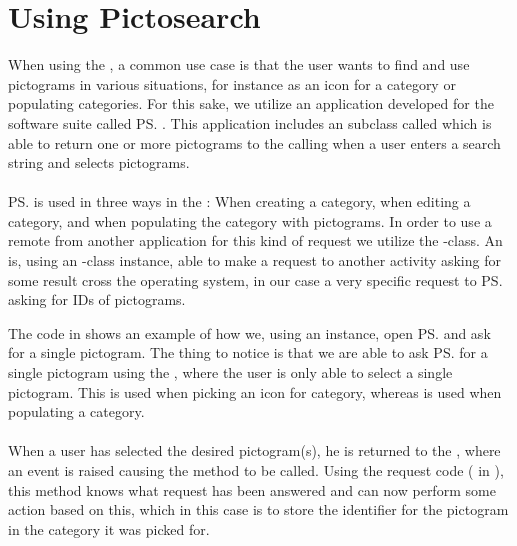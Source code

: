 
\section{Using Pictosearch}
\label{sec:using_pictosearch}

When using the \ct, a common use case is that the user wants to find and use pictograms in various situations, for instance as an icon for a category or populating categories. For this sake, we utilize an application developed for the \giraf software suite called \ps. This application includes an  subclass called  which is able to return one or more pictograms to the calling  when a user enters a search string and selects pictograms. 
\\\\
\ps is used in three ways in the \ct: When creating a category, when editing a category, and when populating the category with pictograms. In order to use a remote  from another application for this kind of request we utilize the -class. An  is, using an -class instance, able to make a request to another activity asking for some result cross the operating system, in our case a very specific request to \ps asking for IDs of pictograms. 



The code in  shows an example of how we, using an  instance, open \ps and ask for a single pictogram. The thing to notice is that we are able to ask \ps for a single pictogram using the , where the user is only able to select a single pictogram. This is used when picking an icon for category, whereas  is used when populating a category. 
\\\\
When a user has selected the desired pictogram(s), he is returned to the \ct, where an event is raised causing the method  to be called. Using the request code ( in ), this method knows what request has been answered and can now perform some action based on this, which in this case is to store the identifier for the pictogram in the category it was picked for.

